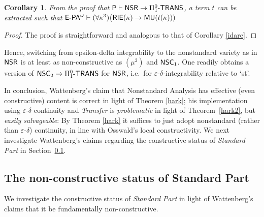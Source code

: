 \documentclass[reqno]{amsart}
\newtheorem{thm}{Theorem}
\newtheorem{cor}[thm]{Corollary}
\newtheorem{defi}[thm]{Definition}
\def\bdefi{\begin{defi}\rm}
\def\edefi{\end{defi}}
\def\RCAo{\textup{\textsf{RCA}}_{0}^{\omega}}
\def\P{\textup{\textsf{P}}}
\def\di{\rightarrow}
\def\eps{\varepsilon}
\def\paai{\Pi_{1}^{0}\textup{-\textsf{TRANS}}}
\def\NSR{\textup{\textsf{NSR}}}
\def\NSC{\textup{\textsf{NSC}}}
\def\NSD{\textup{\textsf{NSD}}}
\def\MU{\textup{\textsf{MU}}}
\numberwithin{equation}{section}
\numberwithin{thm}{section}
\begin{document}
\begin{cor}\label{idare22}
From the proof that $\P\vdash \NSR\di \paai$, a term $t$ can be extracted such that $\textsf{\textup{E-PA}}^{\omega}\vdash (\forall \kappa^{3})\big(\textsf{\textup{RIE}}(\kappa)\di \MU(t(\kappa)))$
\end{cor}
\begin{proof}
The proof is straightforward and analogous to that of Corollary \ref{idare}. 
\end{proof}
Hence, switching from epsilon-delta integrability to the nonstandard variety as in $\NSR$ is at least as non-constructive as $(\mu^{2})$ and $\NSC_{1}$. 
One readily obtains a version of $\NSC_{2}\di \paai$ for $\NSR$, i.e.\ for $\eps$-$\delta$-integrability relative to `st'.  
%

\medskip

In conclusion, Wattenberg's claim that Nonstandard Analysis has effective (even constructive) content is correct in light of Theorem \ref{hark}; his implementation using $\eps$-$\delta$ continuity and \emph{Transfer} is \emph{problematic} in light of Theorem~\ref{hark2}, but \emph{easily salvageable}: By Theorem \ref{hark} it suffices to just adopt nonstandard (rather than $\eps$-$\delta$) continuity, in line with Osswald's local constructivity.  
We next investigate Wattenberg's claims regarding the constructive status of \emph{Standard Part} in Section~\ref{bad}.



\subsection{The non-constructive status of Standard Part}\label{bad}
We investigate the constructive status of \emph{Standard Part} in light of Wattenberg's claims that it be fundamentally non-constructive.  

\medskip
\end{document}
